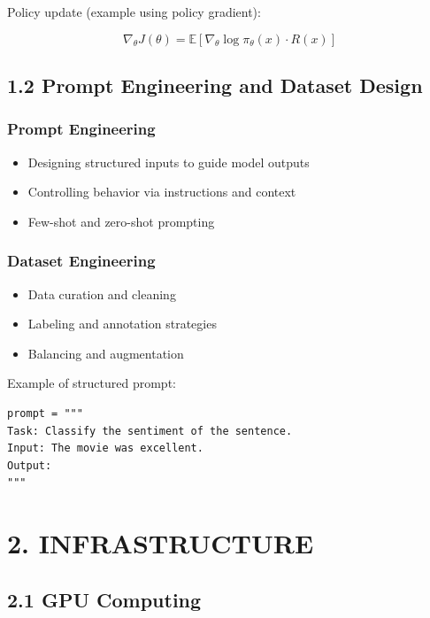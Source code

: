 Policy update (example using policy gradient):

\[
\nabla_\theta J(\theta) = \mathbb{E} \left[ \nabla_\theta \log \pi_\theta(x) \cdot R(x) \right]
\]

\subsection*{1.2 Prompt Engineering and Dataset Design}

\subsubsection*{Prompt Engineering}

\begin{itemize}
\item Designing structured inputs to guide model outputs
\item Controlling behavior via instructions and context
\item Few-shot and zero-shot prompting
\end{itemize}

\subsubsection*{Dataset Engineering}

\begin{itemize}
\item Data curation and cleaning
\item Labeling and annotation strategies
\item Balancing and augmentation
\end{itemize}

Example of structured prompt:

\begin{verbatim}
prompt = """
Task: Classify the sentiment of the sentence.
Input: The movie was excellent.
Output:
"""
\end{verbatim}

\vspace{0.5cm}

\section*{2. INFRASTRUCTURE}

\subsection*{2.1 GPU Computing}

